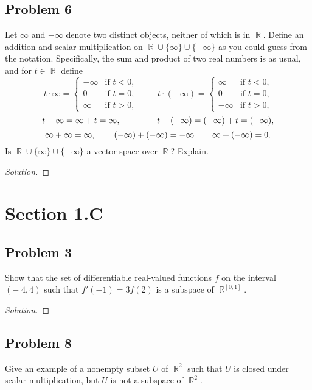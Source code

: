 \documentclass[letterpaper, 12pt]{amsart}
\DeclareMathOperator{\R}{\mathbb{R}}
\theoremstyle{definition}  %
\begin{document}
		\subsection*{Problem 6}
		Let $\infty$ and $-\infty$ denote two distinct objects, neither of which is in $\R$.
		Define an addition and scalar multiplication on $\R \cup \{\infty\} \cup \{-\infty\}$ as you could guess from the notation.
		Specifically, the sum and product of two real numbers is as usual, and for $t \in \R$ define \[ t \cdot \infty = \begin{cases} -\infty & \text{if $t < 0$,} \\ 0 & \text{if $t = 0$,} \\ \infty & \text{if $t > 0$,} \end{cases} \hspace{1cm} t \cdot (-\infty) = \begin{cases} \infty & \text{if $t < 0$,} \\ 0 & \text{if $t = 0$,} \\ -\infty & \text{if $t > 0$,} \end{cases} \]
		\[ t + \infty = \infty + t = \infty, \hspace{1.5cm} t + (-\infty) = (-\infty) + t = (-\infty), \]
		\[ \infty + \infty = \infty, \hspace{.75cm} (-\infty) + (-\infty) = -\infty \hspace{.75cm} \infty + (-\infty) = 0. \]
		Is $\R \cup \{\infty\} \cup \{-\infty\}$ a vector space over $\R$?
		Explain.

		\begin{proof}[Solution]
		\end{proof}

	\section*{Section 1.C}	
		\subsection*{Problem 3}
		Show that the set of differentiable real-valued functions $f$ on the interval $(-􏰈4, 4)$ such that $f'(-1) = 3f(2)$ is a subspace of $\R^{[0,1]}$.

		\begin{proof}[Solution]
		\end{proof}

		\subsection*{Problem 8}
		Give an example of a nonempty subset $U$ of $\R^{2}$ such that $U$ is closed under scalar multiplication, but $U$ is not a subspace of $\R^{2}$.
\end{document}
